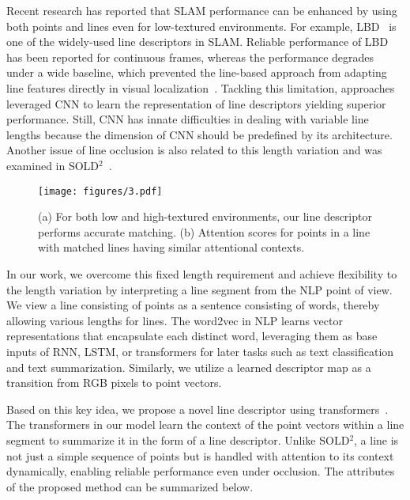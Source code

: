 \documentclass[letterpaper, 10 pt, journal, twoside]{ieeetran}
\begin{document}
Recent research has reported that \ac{SLAM} performance can be enhanced by using both points and lines \cite{Gomez2016, Pumarola2017, Gomez2019, Yang2019} even for low-textured environments. For example, \ac{LBD}~\cite{LBD2013} is one of the widely-used line descriptors in \ac{SLAM}. Reliable performance of \ac{LBD} has been reported for continuous frames, whereas the performance degrades under a wide baseline, which prevented the line-based approach from adapting line features directly in visual localization~\cite{Toft2020, Paul2019}. Tackling this limitation, approaches leveraged \acf{CNN} to learn the representation of line descriptors \cite{LLD2019, DLD2019, WLD2020} yielding superior performance. Still, \ac{CNN} has innate difficulties in dealing with variable line lengths because the dimension of \ac{CNN} should be predefined by its architecture. Another issue of line occlusion is also related to this length variation and was examined in SOLD$^2$~\cite{Pautrat2021}.

\begin{figure}[!t]
	\centering
	\texttt{[image: figures/3.pdf]}
	\caption{(a) For both low and high-textured environments, our line descriptor performs accurate matching. (b) Attention scores for points in a line with matched lines having similar attentional contexts.}
	\label{fig:main}
	\vspace{-5mm}
\end{figure}


In our work, we overcome this fixed length requirement and achieve flexibility to the length variation by interpreting a line segment from the \acf{NLP} point of view. We view a line consisting of points as a sentence consisting of words, thereby allowing various lengths for lines. The word2vec in \ac{NLP} learns vector representations that encapsulate each distinct word, leveraging them as base inputs of RNN, LSTM, or transformers for later tasks such as text classification and text summarization. Similarly, we utilize a learned descriptor map as a transition from RGB pixels to point vectors.

Based on this key idea, we propose a novel line descriptor using transformers~\cite{Vaswani2017}. The transformers in our model learn the context of the point vectors within a line segment to summarize it in the form of a line descriptor. Unlike SOLD$^2$, a line is not just a simple sequence of points but is handled with attention to its context dynamically, enabling reliable performance even under occlusion.
The attributes of the proposed method can be summarized below.
\end{document}
